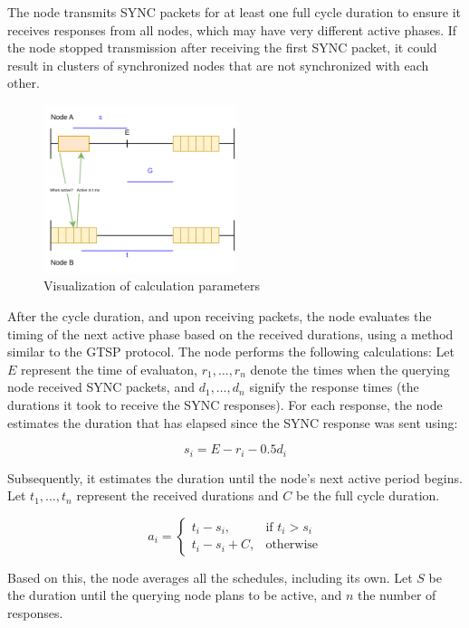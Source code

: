 The node transmits SYNC packets for at least one full cycle duration to ensure it receives responses from all nodes, which may have very different active phases. If the node stopped transmission after receiving the first SYNC packet, it could result in clusters of synchronized nodes that are not synchronized with each other.

\begin{figure}[h]
	\centering
	\includegraphics[width=0.5\textwidth]{figures/synchronization.png}
	\caption{Visualization of calculation parameters}
\end{figure}

After the cycle duration, and upon receiving packets, the node evaluates the timing of the next active phase based on the received durations, using a method similar to the GTSP protocol. The node performs the following calculations: Let \( E \) represent the time of evaluaton, \( r_1, \ldots, r_n \) denote the times when the querying node received SYNC packets, and \( d_1, \ldots, d_n \) signify the response times (the durations it took to receive the SYNC responses). For each response, the node estimates the duration that has elapsed since the SYNC response was sent using:

\[ s_i = E - r_i - 0.5d_i \]

Subsequently, it estimates the duration until the node's next active period begins. Let \( t_1, \ldots, t_n \) represent the received durations and $C$ be the full cycle duration.

\[a_i =
	\begin{cases}
		t_i - s_i,     & \text{if } t_i > s_i \\
		t_i - s_i + C, & \text{otherwise}
	\end{cases}
\]

Based on this, the node averages all the schedules, including its own. Let \( S \) be the duration until the querying node plans to be active, and \( n \) the number of responses.

